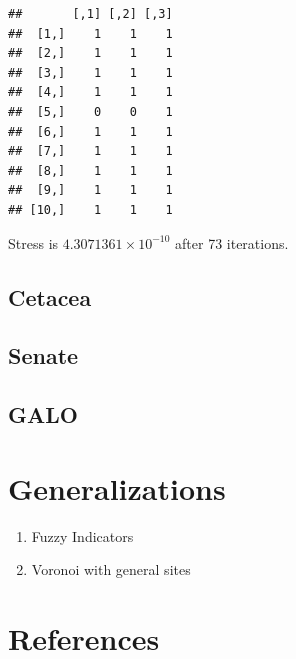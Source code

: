 \documentclass[
  12pt,
]{article}
\providecommand{\tightlist}{%
  \setlength{\itemsep}{0pt}\setlength{\parskip}{0pt}}
\begin{document}
\begin{verbatim}
##       [,1] [,2] [,3]
##  [1,]    1    1    1
##  [2,]    1    1    1
##  [3,]    1    1    1
##  [4,]    1    1    1
##  [5,]    0    0    1
##  [6,]    1    1    1
##  [7,]    1    1    1
##  [8,]    1    1    1
##  [9,]    1    1    1
## [10,]    1    1    1
\end{verbatim}

Stress is \ensuremath{4.3071361\times 10^{-10}} after 73 iterations.

\subsection{Cetacea}\label{cetacea}

\subsection{Senate}\label{senate}

\subsection{GALO}\label{galo}

\section{Generalizations}\label{generalizations}

\begin{enumerate}
\def\labelenumi{\arabic{enumi}.}
\tightlist
\item
  Fuzzy Indicators
\item
  Voronoi with general sites
\end{enumerate}

\section*{References}\label{references}
\end{document}
